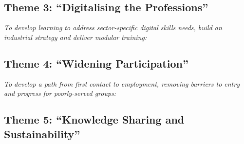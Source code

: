 \documentclass[conference]{IEEEtran}
\begin{document}
\subsection*{Theme 3: ``Digitalising the Professions''}

{\emph{To develop learning to address sector-specific digital skills
needs, build an industrial strategy and deliver modular
training:}}\newline


\subsection*{Theme 4: ``Widening Participation''}

{\emph{To develop a path from first contact to employment, removing
barriers to entry and progress for poorly-served groups:}}\newline


\subsection*{Theme 5: ``Knowledge Sharing and Sustainability''}
\end{document}
